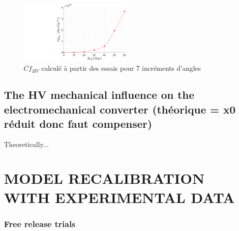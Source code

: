 \documentclass[3p,twocolumn,preprint]{elsarticle}
\begin{document}
\begin{figure}[!htbp]
\begin{center}
	\captionsetup{justification=centering}
	\includegraphics[trim={10cm 0cm 0cm 0cm},clip,width=0.49\textwidth]{figures/resultats_essais_hydraulique_VH_D1mm.pdf}
	\caption{$Cf_{HV}$ calculé à partir des essais pour 7 incréments d'angles}
	\label{fig:resultats_essais_hydraulique_VH_D1mm}
\end{center}
\end{figure}
	\subsection{The HV mechanical influence on the electromechanical converter (théorique = x0 réduit donc faut compenser)}	
	\label{The mechanical influence of the valve on the electromechanical converter}
Theoretically...

\section{MODEL RECALIBRATION WITH EXPERIMENTAL DATA}
\label{sec:MODEL RECALIBRATION WITH EXPERIMENTAL DATA}
	\subsubsection{Free release trials}
\end{document}
